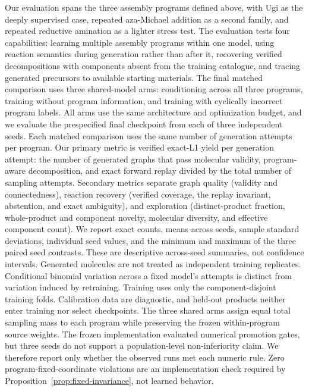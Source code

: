 \documentclass{article}
\begin{document}
Our evaluation spans the three assembly programs defined above, with Ugi as the deeply supervised
case, repeated aza-Michael addition as a second family, and repeated reductive amination as a lighter
stress test.
The evaluation tests four capabilities: learning multiple assembly programs within one model, using
reaction semantics during generation rather than after it, recovering verified decompositions with
components absent from the training catalogue, and tracing generated precursors to available
starting materials.
The final matched comparison uses three shared-model arms: conditioning across all three programs,
training without program information, and training with cyclically incorrect program labels.
All arms use the same architecture and optimization budget, and we evaluate the prespecified final
checkpoint from each of three independent seeds.
Each matched comparison uses the same number of generation attempts per program.
Our primary metric is verified exact-L1 yield per generation attempt: the number of generated graphs that
pass molecular validity, program-aware decomposition, and exact forward replay divided by the total
number of sampling attempts.
Secondary metrics separate graph quality (validity and connectedness), reaction recovery (verified
coverage, the replay invariant, abstention, and exact ambiguity), and exploration (distinct-product fraction, whole-product and
component novelty, molecular diversity, and effective component count).
We report exact counts, means across seeds, sample standard deviations, individual seed values, and
the minimum and maximum of the three paired seed contrasts. These are descriptive across-seed
summaries, not confidence intervals. Generated molecules are not treated as independent training
replicates. Conditional binomial variation across a fixed model's
\ForgeProseAttemptsPerProgram{} attempts is distinct from
variation induced by retraining.
Training uses only the component-disjoint training folds.
Calibration data are diagnostic, and held-out products neither enter training nor select
checkpoints.
The three shared arms assign equal total sampling mass to each program while preserving the frozen
within-program source weights.
The frozen implementation evaluated numerical promotion gates, but three seeds do not support a
population-level non-inferiority claim. We therefore report only whether the observed runs met each
numeric rule. Zero program-fixed-coordinate violations are an implementation check required by
Proposition~\ref{prop:fixed-invariance}, not learned behavior.
\end{document}
